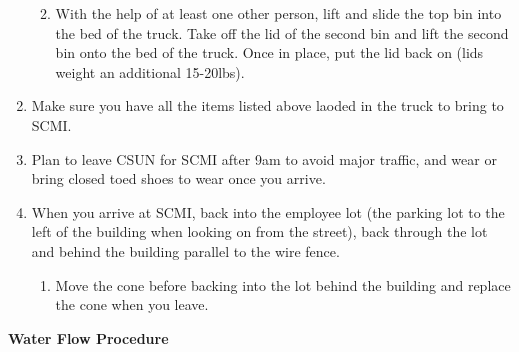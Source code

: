\documentclass[
]{book}
\providecommand{\tightlist}{%
  \setlength{\itemsep}{0pt}\setlength{\parskip}{0pt}}
\begin{document}
\begin{enumerate}
  \begin{enumerate}
  \def\labelenumii{\arabic{enumii}.}
  \tightlist
  \item
    With the help of at least one other person, lift and slide the top bin into the bed of the truck. Take off the lid of the second bin and lift the second bin onto the bed of the truck. Once in place, put the lid back on (lids weight an additional 15-20lbs).
  \end{enumerate}
\item
  Make sure you have all the items listed above laoded in the truck to bring to SCMI.
\item
  Plan to leave CSUN for SCMI after 9am to avoid major traffic, and wear or bring closed toed shoes to wear once you arrive.
\item
  When you arrive at SCMI, back into the employee lot (the parking lot to the left of the building when looking on from the street), back through the lot and behind the building parallel to the wire fence.

  \begin{enumerate}
  \def\labelenumii{\arabic{enumii}.}
  \tightlist
  \item
    Move the cone before backing into the lot behind the building and replace the cone when you leave.
  \end{enumerate}
\end{enumerate}

\textbf{Water Flow Procedure}
\end{document}
